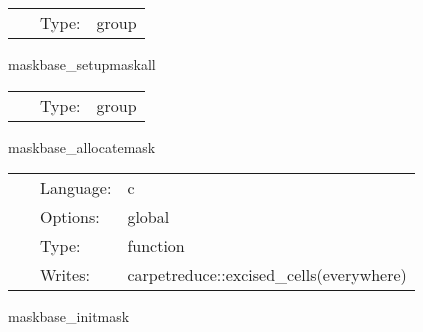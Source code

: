 \hspace{5mm}{\it set up the weight function } 


\hspace{5mm}

 \begin{tabular*}{160mm}{cll} 
~ & Type:  & group \\ 
\end{tabular*} 


\vspace{5mm}


\hspace{5mm} maskbase\_setupmaskall 

\hspace{5mm}{\it set up the weight function } 


\hspace{5mm}

 \begin{tabular*}{160mm}{cll} 
~ & Type:  & group \\ 
\end{tabular*} 


\vspace{5mm}


\hspace{5mm} maskbase\_allocatemask 

\hspace{5mm}{\it allocate the weight function } 


\hspace{5mm}

 \begin{tabular*}{160mm}{cll} 
~ & Language:  & c \\ 
~ & Options:  & global \\ 
~ & Type:  & function \\ 
~ & Writes:  & carpetreduce::excised\_cells(everywhere) \\ 
\end{tabular*} 


\vspace{5mm}


\hspace{5mm} maskbase\_initmask 

\hspace{5mm}{\it initialise the weight function } 


